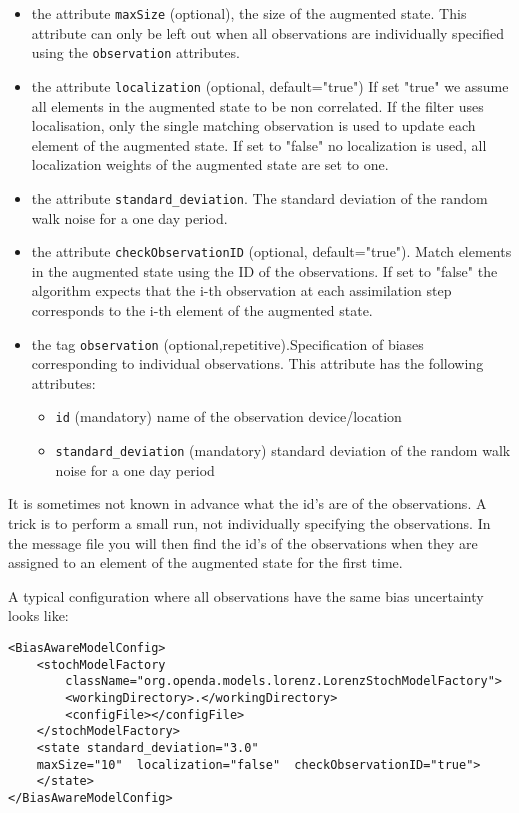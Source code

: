 \begin{itemize}
\item the attribute {\tt maxSize} (optional), the size of the augmented state. This attribute can only be left out when all observations are individually specified using the {\tt observation} attributes.
\item the attribute {\tt localization} (optional, default="true") If set "true" we assume all elements in the augmented state to be non correlated. If the filter uses localisation, only the single matching observation is used to update each element of the augmented state. If set to "false" no localization is used, all localization weights of  the augmented state are set to one.
\item the attribute {\tt standard\_deviation}. The standard deviation of the random walk noise for a one day period.
\item the attribute {\tt checkObservationID} (optional, default="true"). Match elements in the augmented state using the ID of the observations. If set to "false" the algorithm expects that the i-th observation at each assimilation step corresponds to the i-th element of the augmented state.  
\item the tag {\tt observation} (optional,repetitive).Specification of biases corresponding to individual observations. This attribute has the following attributes:
   \begin{itemize}
   \item {\tt id} (mandatory) name of the observation device/location
   \item {\tt standard\_deviation} (mandatory) standard deviation of the random walk noise for a one day
            period
   \end{itemize} 
\end{itemize}

It is sometimes not known in advance what the id's are of the observations. A trick is to perform a small run, not individually specifying the observations. In the message file you will then find the id's of the observations when they are assigned to an element of the augmented state for the first time.

A typical configuration where all observations have the same bias uncertainty looks like:
\begin{verbatim}
<BiasAwareModelConfig>
	<stochModelFactory
		className="org.openda.models.lorenz.LorenzStochModelFactory">
		<workingDirectory>.</workingDirectory>
		<configFile></configFile>
	</stochModelFactory>
	<state standard_deviation="3.0"
	maxSize="10"  localization="false"  checkObservationID="true">
	</state>
</BiasAwareModelConfig>
\end{verbatim}

